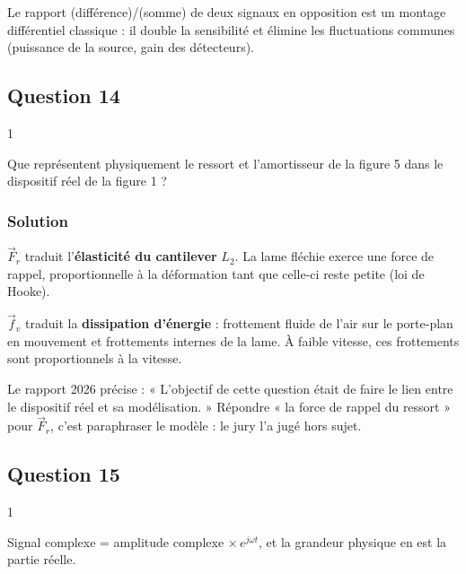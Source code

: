 \documentclass[11pt,a4paper]{article}
\begin{document}
\begin{methode}

Le rapport (différence)/(somme) de deux signaux en opposition est un montage différentiel classique : il double la sensibilité et élimine les fluctuations communes (puissance de la source, gain des détecteurs).

\end{methode}

\hypertarget{question-14}{%
\subsection{Question 14}\label{question-14}}

\begin{indication}{1}

Que représentent physiquement le ressort et l'amortisseur de la figure 5 dans le dispositif réel de la figure 1 ?

\end{indication}

\hypertarget{solution-13}{%
\subsubsection{Solution}\label{solution-13}}

\(\vec F_r\) traduit l'\textbf{élasticité du cantilever} \(L_2\). La lame fléchie exerce une force de rappel, proportionnelle à la déformation tant que celle-ci reste petite (loi de Hooke).

\(\vec f_v\) traduit la \textbf{dissipation d'énergie} : frottement fluide de l'air sur le porte-plan en mouvement et frottements internes de la lame. À faible vitesse, ces frottements sont proportionnels à la vitesse.

\begin{jury}

Le rapport 2026 précise : « L'objectif de cette question était de faire le lien entre le dispositif réel et sa modélisation. » Répondre « la force de rappel du ressort » pour \(\vec F_r\), c'est paraphraser le modèle : le jury l'a jugé hors sujet.

\end{jury}

\hypertarget{question-15}{%
\subsection{Question 15}\label{question-15}}

\begin{indication}{1}

Signal complexe = amplitude complexe \(\times\,e^{j\omega t}\), et la grandeur physique en est la partie réelle.

\end{indication}
\end{document}
